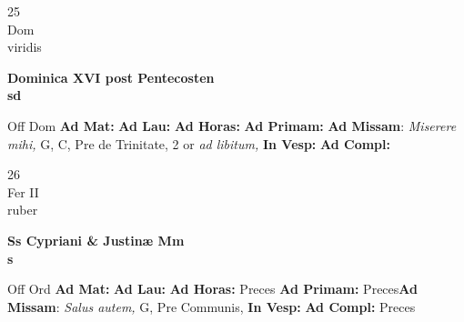 \documentclass[10pt, openany]{book}
\begin{document}
    \begin{center}
        \begin{minipage}{3.5in}
            \vspace{2em}
            \begin{minipage}{0.5in}
                {\Huge 25} \\
                {\normalsize Dom} \\
                {\normalsize viridis}
            \end{minipage}
            \begin{minipage}{3.0in}
                \textbf{ \large Dominica XVI post Pentecosten \\
                \textnormal{\normalsize sd}} \\ 
            \end{minipage}
            \begin{justify}Off Dom
                \textbf{Ad Mat: }
                \textbf{Ad Lau: }
                \textbf{Ad Horas: }
                \textbf{Ad Primam: }\textbf{Ad Missam}: \textit{Miserere mihi,} G, C, Pre de Trinitate, 2 or \textit{ad libitum,}  
                \textbf{In Vesp: }
                \textbf{Ad Compl: }
            \end{justify}
        \end{minipage}
    \end{center}

    \begin{center}
        \begin{minipage}{3.5in}
            \vspace{2em}
            \begin{minipage}{0.5in}
                {\Huge 26} \\
                {\normalsize Fer II} \\
                {\normalsize ruber}
            \end{minipage}
            \begin{minipage}{3.0in}
                \textbf{ \large Ss Cypriani \& Justinæ Mm \\
                \textnormal{\normalsize s}} \\ 
            \end{minipage}
            \begin{justify}Off Ord
                \textbf{Ad Mat: }
                \textbf{Ad Lau: }
                \textbf{Ad Horas: }Preces
                \textbf{Ad Primam: }Preces\textbf{Ad Missam}: \textit{Salus autem,} G, Pre Communis,  
                \textbf{In Vesp: }
                \textbf{Ad Compl: }Preces
            \end{justify}
        \end{minipage}
    \end{center}
\end{document}
